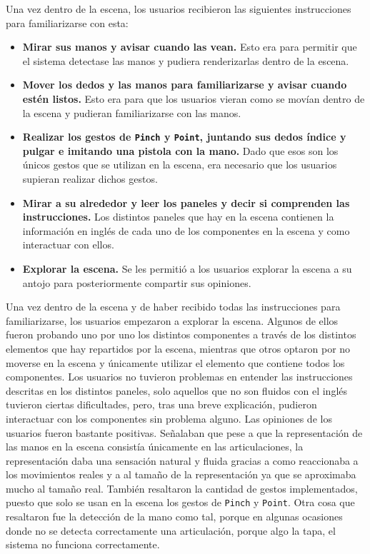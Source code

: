 \documentclass[a4paper, 12pt]{book}
\begin{document}
Una vez dentro de la escena, los usuarios recibieron las siguientes instrucciones para familiarizarse con esta: 

\begin{itemize}
  \item \textbf{Mirar sus manos y avisar cuando las vean.} Esto era para permitir que el sistema detectase las manos y pudiera renderizarlas dentro de la escena.
  \item \textbf{Mover los dedos y las manos para familiarizarse y avisar cuando estén listos.} Esto era para que los usuarios vieran como se movían dentro de la escena y pudieran familiarizarse con las manos.
  \item \textbf{Realizar los gestos de \texttt{Pinch} y \texttt{Point}, juntando sus dedos índice y pulgar e imitando una pistola con la mano.} Dado que esos son los únicos gestos que se utilizan en la escena, era necesario que los usuarios supieran realizar dichos gestos.
  \item \textbf{Mirar a su alrededor y leer los paneles y decir si comprenden las instrucciones.} Los distintos paneles que hay en la escena contienen la información en inglés de cada uno de los componentes en la escena y como interactuar con ellos.
  \item \textbf{Explorar la escena.} Se les permitió a los usuarios explorar la escena a su antojo para posteriormente compartir sus opiniones.
\end{itemize}

Una vez dentro de la escena y de haber recibido todas las instrucciones para familiarizarse, los usuarios empezaron a explorar la escena. Algunos de ellos fueron probando uno por uno los distintos componentes a través de los distintos elementos que hay repartidos por la escena, mientras que otros optaron por no moverse en la escena y únicamente utilizar el elemento que contiene
todos los componentes. Los usuarios no tuvieron problemas en entender las instrucciones descritas en los distintos paneles, solo aquellos que no son fluidos con el inglés tuvieron ciertas dificultades, pero, tras una breve explicación, pudieron interactuar con los componentes sin problema alguno. 
Las opiniones de los usuarios fueron bastante positivas. Señalaban que pese a que la representación de las manos en la escena consistía únicamente en las articulaciones, la representación daba una sensación natural y fluida gracias a como reaccionaba a los movimientos reales y a al tamaño de la representación ya que se aproximaba mucho al tamaño real.
También resaltaron la cantidad de gestos implementados, puesto que solo se usan en la escena los gestos de \texttt{Pinch} y \texttt{Point}. Otra cosa que resaltaron fue la detección de la mano como tal, porque en algunas ocasiones donde no se detecta correctamente una articulación, porque algo la tapa, el sistema no funciona correctamente. 
\end{document}
